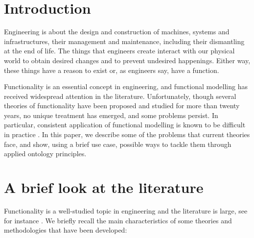 \documentclass[
]{ceurart}
\begin{document}
\maketitle


\section{Introduction}
    
Engineering is about the design and construction of machines, systems and infrastructures, their management and maintenance, including their dismantling at the end of life. The things that engineers create interact with our physical world to obtain desired changes and to prevent undesired happenings. Either way, these things have a reason to exist or, as engineers say, have a function. 

Functionality is an essential concept in engineering, and functional modelling has received widespread attention in the literature. 
Unfortunately, though several theories of functionality have been proposed and studied for more than twenty years, no unique treatment has emerged, and some problems persist. In particular, consistent application of functional modelling is known to be difficult in practice \cite{eckertThatWhichNot2013}.
In this paper, we describe some of the problems that current theories face, and show, using a brief use case, possible ways to tackle them through applied ontology principles.

\section{A brief look at the literature}\label{sec:literature}

Functionality is a well-studied topic in engineering and the literature is large, %
see for instance \cite{pahl_engineering_2007,erdenReviewFunctionModeling2008}. %
We briefly recall the main characteristics of some theories and methodologies that have been developed: %
\end{document}
